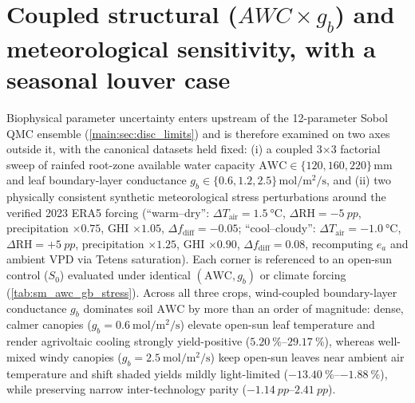 \documentclass[preprint,12pt,a4paper]{elsarticle}
\begin{document}
\section{Coupled structural ($AWC\times g_b$) and meteorological sensitivity, with a seasonal louver case}
\label{sec:sm_structural_louver}

Biophysical parameter uncertainty enters upstream of the \num{12}-parameter Sobol QMC ensemble (\cref{main:sec:disc_limits}) and is therefore examined on two axes outside it, with the canonical datasets held fixed: (i) a coupled \num{3}$\times$\num{3} factorial sweep of rainfed root-zone available water capacity $\mathrm{AWC}\in\{\num{120}, \num{160}, \num{220}\}\,\unit{\milli\meter}$ and leaf boundary-layer conductance $g_b\in\{\num{0.6}, \num{1.2}, \num{2.5}\}\,\unit{\mole\per\square\meter\per\second}$, and (ii) two physically consistent synthetic meteorological stress perturbations around the verified 2023 ERA5 forcing (``warm--dry'': $\Delta T_{\mathrm{air}}=\qty{+1.5}{\celsius}$, $\Delta\mathrm{RH}=-\qty{5}{pp}$, precipitation $\times\num{0.75}$, GHI $\times\num{1.05}$, $\Delta f_{\mathrm{diff}}=\num{-0.05}$; ``cool--cloudy'': $\Delta T_{\mathrm{air}}=\qty{-1.0}{\celsius}$, $\Delta\mathrm{RH}=+\qty{5}{pp}$, precipitation $\times\num{1.25}$, GHI $\times\num{0.90}$, $\Delta f_{\mathrm{diff}}=\num{+0.08}$, recomputing $e_a$ and ambient VPD via Tetens saturation). Each corner is referenced to an open-sun control ($S_0$) evaluated under identical $(\mathrm{AWC}, g_b)$ or climate forcing (\cref{tab:sm_awc_gb_stress}). Across all three crops, wind-coupled boundary-layer conductance $g_b$ dominates soil $\mathrm{AWC}$ by more than an order of magnitude: dense, calmer canopies ($g_b=\qty{0.6}{\mole\per\square\meter\per\second}$) elevate open-sun leaf temperature and render agrivoltaic cooling strongly yield-positive ($\qtyrange{+5.20}{+29.17}{\percent}$), whereas well-mixed windy canopies ($g_b=\qty{2.5}{\mole\per\square\meter\per\second}$) keep open-sun leaves near ambient air temperature and shift shaded yields mildly light-limited ($\qtyrange{-13.40}{-1.88}{\percent}$), while preserving narrow inter-technology parity ($\qtyrange{-1.14}{+2.41}{pp}$).
\end{document}
